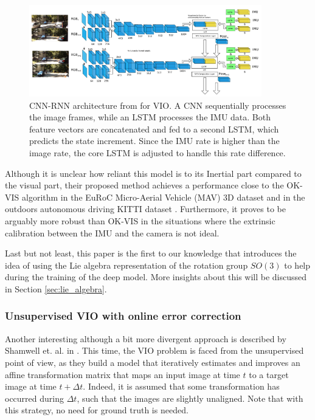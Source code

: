 \begin{figure}[h]
   \centering
   \includegraphics[width=0.90\textwidth]{thesis_template/img/vionet_original_architecture.png}
   \caption{CNN-RNN architecture from \cite{DBLP:journals/corr/ClarkWWMT17} for VIO. A CNN sequentially processes the image frames, while an LSTM processes the IMU data. Both feature vectors are concatenated and fed to a second LSTM, which predicts the state increment. Since the IMU rate is higher than the image rate, the core LSTM is adjusted to handle this rate difference.}
   \label{fig:original_vionet}
\end{figure}

Although it is unclear how reliant this model is to its Inertial part compared to the visual part, their proposed method achieves a performance close to the OK-VIS algorithm \cite{okvis} in the EuRoC \cite{Burri25012016} Micro-Aerial Vehicle (MAV) 3D dataset and in the outdoors autonomous driving KITTI dataset \cite{Geiger2012CVPR, Geiger2013IJRR}. 
Furthermore, it proves to be arguably more robust than OK-VIS in the situations where the extrinsic calibration between the IMU and the camera is not ideal. 

Last but not least, this paper is the first to our knowledge that introduces the idea of using the Lie algebra representation of the rotation group $SO(3)$ to help during the training of the deep model.
More insights about this will be discussed in Section \ref{sec:lie_algebra}.

\subsubsection{Unsupervised VIO with online error correction}
Another interesting although a bit more divergent approach is described by Shamwell et. al. in \cite{DBLP:journals/corr/abs-1803-05850}. 
This time, the VIO problem is faced from the unsupervised point of view, as they build a model that iteratively estimates and improves an affine transformation matrix that maps an input image at time $t$ to a target image at time $t+\Delta t$.
Indeed, it is assumed that some transformation has occurred during $\Delta t$, such that the images are slightly unaligned.
Note that with this strategy, no need for ground truth is needed.

